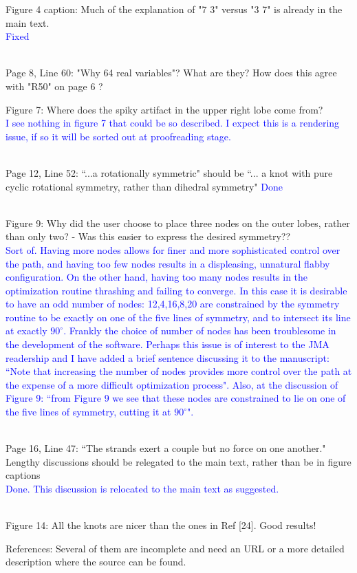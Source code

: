 \documentclass[12pt]{article}
\begin{document}
Figure 4 caption: Much of the explanation of "7 3" versus "3 7" is
already in the main text.  \textcolor{blue}{\\Fixed\\ \\}


Page 8, Line 60: "Why 64 real variables"?  What are they?  How does
this agree with "R50" on page 6 ?

Figure 7: Where does the spiky artifact in the upper right lobe come
from?  \textcolor{blue}{\\I see nothing in figure 7 that could be so
  described.  I expect this is a rendering issue, if so it will be
  sorted out at proofreading stage.\\ \\}


Page 12, Line 52: ``...a rotationally symmetric" should be ``... a knot with
pure cyclic rotational symmetry, rather than dihedral symmetry"
  \textcolor{blue}{Done\\ \\}


Figure 9: Why did the user choose to place three nodes on the outer
lobes, rather than only two? - Was this easier to express the desired
symmetry??  \textcolor{blue}{\\Sort of.  Having more nodes allows for
  finer and more sophisticated control over the path, and having too
  few nodes results in a displeasing, unnatural flabby configuration.
  On the other hand, having too many nodes results in the optimization
  routine thrashing and failing to converge.  In this case it is
  desirable to have an odd number of nodes: 12,4,16,8,20 are
  constrained by the symmetry routine to be exactly on one of the five
  lines of symmetry, and to intersect its line at exactly $90^\circ$.
  Frankly the choice of number of nodes has been troublesome in the
  development of the software.  Perhaps this issue is of interest to
  the JMA readership and I have added a brief sentence discussing it
  to the manuscript: ``Note that increasing the number of nodes
  provides more control over the path at the expense of a more
  difficult optimization process".  Also, at the discussion of Figure
  9: ``from Figure 9 we see that these nodes are constrained to lie on
  one of the five lines of symmetry, cutting it at $90^\circ$".\\ \\}

Page 16, Line 47: ``The strands exert a couple but no force on one
another."  Lengthy discussions should be relegated to the main text,
rather than be in figure captions \textcolor{blue}{\\Done.  This
  discussion is relocated to the main text as suggested.\\ \\}


Figure 14: All the knots are nicer than the ones in Ref [24].  Good
results!

References: Several of them are incomplete and need an URL or a more
detailed description where the source can be found.
\end{document}
